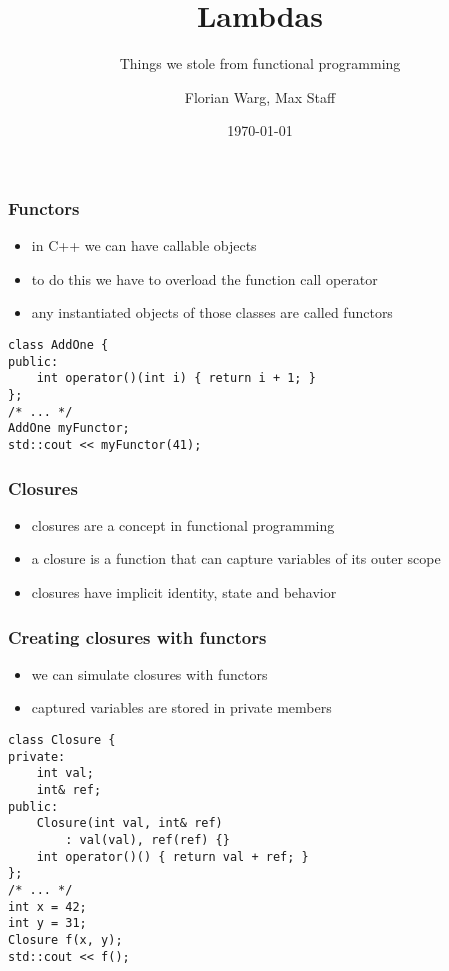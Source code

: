 
\usepackage{colortbl}
\usepackage{multirow}



\title{Lambdas}
\subtitle{Things we stole from functional programming}
\date{\today}
\author{Florian Warg, Max Staff}

\maketitle

\begin{frame}[fragile]
    \frametitle{Functors}
    \begin{itemize}
        \item in C++ we can have callable objects
        \item to do this we have to overload the function call operator
        \item any instantiated objects of those classes are called functors
    \end{itemize}
    \begin{lstlisting}[numbers=none]
class AddOne {
public:
    int operator()(int i) { return i + 1; }
};
/* ... */
AddOne myFunctor;
std::cout << myFunctor(41);
    \end{lstlisting}
\end{frame}

\begin{frame}[fragile]
    \frametitle{Closures}
    \begin{itemize}
        \item closures are a concept in functional programming
        \item a closure is a function that can capture variables of its outer scope
        \item closures have implicit identity, state and behavior
    \end{itemize}
\end{frame}

\begin{frame}[fragile]
    \frametitle{Creating closures with functors}
    \begin{itemize}
        \item we can simulate closures with functors
        \item captured variables are stored in private members
    \end{itemize}
    \begin{lstlisting}[numbers=none]
class Closure {
private:
    int val;
    int& ref;
public:
    Closure(int val, int& ref) 
        : val(val), ref(ref) {}
    int operator()() { return val + ref; }
};
/* ... */
int x = 42;
int y = 31;
Closure f(x, y);
std::cout << f();
    \end{lstlisting}
\end{frame}

